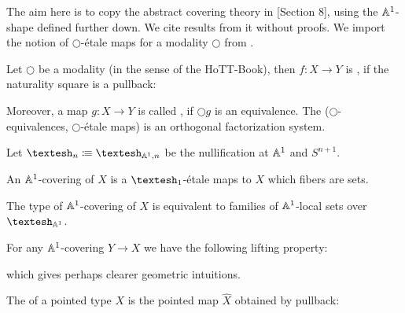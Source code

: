 The aim here is to copy the abstract covering theory in \cite{cherubini_rijke_2021}[Section 8],
using the $\mathbb{A}^1$-shape defined further down. We cite results from it without proofs. We import the notion of $\bigcirc$-étale maps for a modality $\bigcirc$ from \cite{cherubini_rijke_2021}.

\begin{definition}
  Let $\bigcirc$ be a modality (in the sense of the HoTT-Book),
  then $f:X\to Y$ is , if the naturality square is a pullback:
  \begin{center}
  \end{center}
  Moreover, a map $g:X\to Y$ is called ,
  if $\bigcirc g$ is an equivalence.
  The ($\bigcirc$-equivalences, $\bigcirc$-étale maps) is an orthogonal factorization system. 
\end{definition}

\begin{definition}
  Let $\shape_n\colonequiv\shape_{\A^1,n}$ be the nullification at $\mathbb{A}^1$ and $S^{n+1}$.
\end{definition}

\begin{definition}
An $\mathbb{A}^1$-covering of $X$ is a $\shape_1$-étale maps to $X$ which fibers are sets.
\end{definition}

\begin{lemma}
The type of $\mathbb{A}^1$-covering of $X$ is equivalent to families of $\mathbb{A}^1$-local sets over $\shape_{\A^1}$.
\end{lemma}

\begin{remark}
  For any $\mathbb{A}^1$-covering $Y\to X$ we have the following lifting property:
  \begin{center}
  \end{center}
  which gives perhaps clearer geometric intuitions.
\end{remark}

\begin{definition}
  The  of a pointed type $X$ is the pointed map $\hat{X}$ obtained by pullback:
  \begin{center}
  \end{center}
\end{definition}

